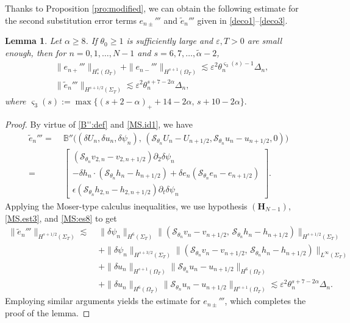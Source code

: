 \documentclass[twoside,11pt]{article}
\numberwithin{equation}{section}
\newtheorem{lemma}{Lemma}[section]
\def\p{\partial}
\begin{document}
Thanks to Proposition \ref{pro:modified},
we can obtain the following estimate for the second substitution error terms $e_{n\pm}'''$ and $\tilde{e}_{n}'''$ given in \eqref{deco1}--\eqref{deco3}.
\begin{lemma} \label{lem:2nd}
	Let ${\alpha }\geq 8$.
	If $\theta_0\geq 1$ is sufficiently  large and $\varepsilon,T>0$ are small enough, then for $n=0,1, \ldots,N-1$  and $s=6,7,\ldots,\widetilde{\alpha}-2 $,
	\begin{align} \nonumber %
		&\|e_{n+}'''\|_{H_*^s(\Omega_{T})}+\|e_{n-}'''\|_{H^{s+1}(\Omega_{T})}\lesssim \varepsilon^2 \theta_n^{\varsigma_3(s)-1}\varDelta_n,\\
		& \|\tilde{e}_{n}''' \|_{ H^{s+1/2}(\Sigma_{T})}\lesssim \varepsilon^2 \theta_n^{s+7-2\alpha}\varDelta_n,
		\nonumber %
	\end{align}
	where	 $\varsigma_3(s):=\max\{(s+2-{\alpha })_++14-2{\alpha },\, s+10-2{\alpha } \}.$
\end{lemma}
\begin{proof}
	By virtue of \eqref{B'':def} and \eqref{MS.id1}, we have
	\begin{align}
		\nonumber \tilde{e}_{n}'''=
		\;&
		\mathbb{B}''
		\big((\delta U_n ,\delta u_n,\delta \psi_n),\, (\mathcal{S}_{\theta_n} U_n-U_{n+1/2},\mathcal{S}_{\theta_n} u_n-u_{n+1/2},0)\big)  \\[1mm]
		=\;&  	\begin{bmatrix}
			(\mathcal{S}_{\theta_n} v_{2,n}-v_{2,n+1/2})\p_2 \delta\psi_n\\[1mm]
			-\delta h_n\cdot (\mathcal{S}_{\theta_n} h_{n}-h_{n+1/2})
			+\delta e_n  (\mathcal{S}_{\theta_n} e_{n}-e_{n+1/2})\\[1mm]
			\epsilon (\mathcal{S}_{\theta_n} h_{2,n}-h_{2,n+1/2})\p_t \delta\psi_n
		\end{bmatrix} .\nonumber
	\end{align}
	Applying the Moser-type calculus inequalities, %
	we use hypothesis $(\mathbf{H}_{{N}-1})$, \eqref{MS.est3}, and \eqref{MS:es8}
	to get
	\begin{align*}
		\|\tilde{e}_{n}''' \|_{ H^{s+1/2}(\Sigma_{T})}\lesssim \;&
		\|\delta\psi_n\|_{ H^{6}(\Sigma_{T})}\|(\mathcal{S}_{\theta_n} v_{n}-v_{n+1/2},\, \mathcal{S}_{\theta_n} h_{n}-h_{n+1/2} )\|_{ H^{s+1/2}(\Sigma_{T})}\\
		& +		\|\delta\psi_n\|_{ H^{s+3/2}(\Sigma_{T})}\|(\mathcal{S}_{\theta_n} v_{n}-v_{n+1/2},\, \mathcal{S}_{\theta_n} h_{n}-h_{n+1/2} )\|_{L^{\infty}(\Sigma_{T})}\\
		& +\|\delta u_n\|_{ H^{s+1}(\Omega_{T})}
		\|\mathcal{S}_{\theta_n} u_{n}-u_{n+1/2}\|_{H^{6}(\Omega_{T})}\\
		&+\|\delta u_n\|_{ H^{6}(\Omega_{T})}
		\|\mathcal{S}_{\theta_n} u_{n}-u_{n+1/2}\|_{H^{s+1}(\Omega_{T})}
		\lesssim \varepsilon^2 \theta_n^{s+7-2\alpha}\varDelta_n.
	\end{align*}
	Employing similar arguments yields the estimate for $e_{n\pm }'''$,  which completes the proof of the lemma.
\end{proof}
\end{document}
